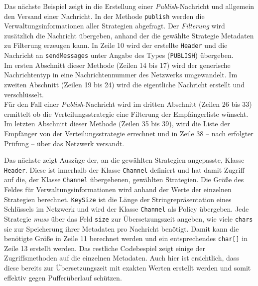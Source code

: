 Das nächste Beispiel zeigt in  die Erstellung einer \emph{Publish}-Nachricht und allgemein den Versand einer Nachricht. In der Methode \texttt{publish} werden die Verwaltungsinformationen aller Strategien abgefragt. Der \emph{Filterung} wird zusätzlich die Nachricht übergeben, anhand der die gewählte Strategie Metadaten zu Filterung erzeugen kann. In Zeile 10 wird der erstellte \texttt{Header} und die Nachricht an \texttt{sendMessages} unter Angabe des Types (\texttt{PUBLISH}) übergeben.\\
Im ersten Abschnitt dieser Methode (Zeilen 14 bis 17) wird der generische Nachrichtentyp in eine Nachrichtennummer des Netzwerks umgewandelt. Im zweiten Abschnitt (Zeilen 19 bis 24) wird die eigentliche Nachricht erstellt und verschlüsselt.\\
Für den Fall einer \emph{Publish}-Nachricht wird im dritten Abschnitt (Zeilen 26 bis 33) ermittelt ob die Verteilungsstrategie eine Filterung der Empfängerliste wünscht.\\
Im letzten Abschnitt dieser Methode (Zeilen 35 bis 39), wird die Liste der Empfänger von der Verteilungsstrategie errechnet und in Zeile 38 -- nach erfolgter Prüfung -- über das Netzwerk versandt.



Das nächste  zeigt Auszüge der, an die gewählten Strategien angepasste, Klasse \texttt{Header}. Diese ist innerhalb der Klasse \texttt{Channel} definiert und hat damit Zugriff auf die, der Klasse \texttt{Channel} übergebenen, gewählten Strategien. Die Größe des Feldes für Verwaltungsinformationen wird anhand der Werte der einzelnen Strategien berechnet. \texttt{KeySize} ist die Länge der Stringrepräsentation eines Schlüssels im Netzwerk und wird der Klasse \texttt{Channel} als Policy übergeben. Jede Strategie \emph{muss} über das Feld \texttt{size} zur Übersetzungszeit angeben, wie viele \texttt{chars} sie zur Speicherung ihrer Metadaten pro Nachricht benötigt. Damit kann die benötigte Größe in Zeile 11 berechnet werden und ein entsprechendes \texttt{char[]} in Zeile 13 erstellt werden. Das restliche Codebespiel zeigt einige der Zugriffsmethoden auf die einzelnen Metadaten. Auch hier ist ersichtlich, dass diese bereits zur Übersetzungszeit mit exakten Werten erstellt werden und somit effektiv gegen Pufferüberlauf schützen. 



